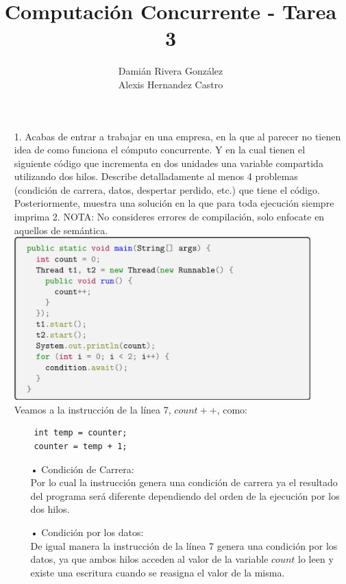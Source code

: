\documentclass[12pt, letterpaper]{article}
\title{Computación Concurrente - Tarea 3}
\author{Damián Rivera González\\Alexis Hernandez Castro}
\begin{document}
\maketitle

\begin{itemize}
\item[1.]Acabas de entrar a trabajar en una empresa, en la que al parecer no tienen
idea de como funciona el cómputo concurrente. Y en la cual tienen el siguiente
código que incrementa en dos unidades una variable compartida utilizando dos
hilos. Describe detalladamente al menos 4 problemas (condición de carrera,
datos, despertar perdido, etc.) que tiene el código. Posteriormente, muestra
una solución en la que para toda ejecución siempre imprima 2. NOTA: No
consideres errores de compilación, solo enfocate en aquellos de semántica.\\

\includegraphics[width=0.9\textwidth]{uno.png}\\

Veamos a la instrucción de la línea 7, $count++$, como: 
\begin{lstlisting}
	int temp = counter;
	counter = temp + 1;
\end{lstlisting}


\begin{itemize}
\item[•] Condición de Carrera:\\
Por lo cual la instrucción genera una condición de carrera ya el resultado del programa será diferente dependiendo del orden de la ejecución por los dos hilos.

\item[• ] Condición por los datos:\\
De igual manera la instrucción de la línea 7 genera una condición por los datos, ya que ambos hilos acceden al valor de la variable $count$ lo leen y existe una escritura cuando se reasigna el valor de la misma.


\end{itemize}
\end{itemize}
\end{document}

